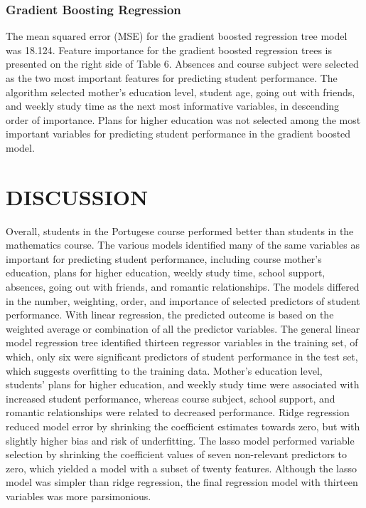 \documentclass[sigconf]{acmart}
\begin{document}

\subsubsection{Gradient Boosting Regression}

The mean squared error (MSE) for the gradient boosted regression tree model  
was 18.124. Feature importance for the gradient boosted regression trees is 
presented on the right side of Table 6. Absences and course subject were 
selected as the two most important features for predicting student performance. 
The algorithm selected mother's education level, student age, going out with 
friends, and weekly study time as the next most informative variables, in 
descending order of importance. Plans for higher education was not selected 
among the most important variables for predicting student performance in 
the gradient boosted model.   


\section{DISCUSSION}

Overall, students in the Portugese course performed better than students in 
the mathematics course. The various models identified many of the same variables 
as important for predicting student performance, including course mother's 
education, plans for higher education, weekly study time, school support, 
absences, going out with friends, and romantic relationships. The models 
differed in the number, weighting, order, and importance of selected predictors 
of student performance. With linear regression, the predicted outcome is based
on the weighted average or combination of all the predictor variables. The 
general linear model regression tree identified thirteen regressor variables 
in the training set, of which, only six were significant predictors of student 
performance in the test set, which suggests overfitting to the training data.
Mother's education level, students' plans for higher education, and weekly study 
time were associated with increased student performance, whereas course subject, 
school support, and romantic relationships were related to decreased performance. 
Ridge regression reduced model error by shrinking the coefficient estimates 
towards zero, but with slightly higher bias and risk of underfitting. The 
lasso model performed variable selection by shrinking the coefficient values 
of seven non-relevant predictors to zero, which yielded a model with a subset 
of twenty features. Although the lasso model was simpler than ridge regression, 
the final regression model with thirteen variables was more parsimonious. 
\end{document}
